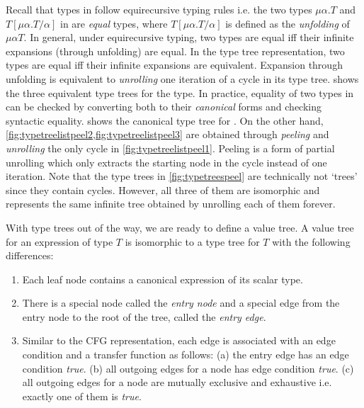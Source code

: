 Recall that types in \SpecL{} follow equirecursive typing rules i.e. the two types $\mu \alpha. T$ and $T[\mu \alpha. T/\alpha]$ in \typegrammar{}
are {\em equal} types, where $T[\mu \alpha. T/\alpha]$ is defined as the {\em unfolding} of $\mu \alpha T$.
In general, under equirecursive typing, two types are equal iff their infinite expansions (through unfolding) are equal.
In the type tree representation, two types are equal iff their infinite expansions are equivalent.
Expansion through unfolding is equivalent to {\em unrolling} one iteration of a cycle in its type tree.
 shows the three equivalent type trees for the  type.
In practice, equality of two types in \typegrammar{} can be checked by converting both to their {\em canonical} forms
and checking syntactic equality.
 shows the canonical type tree for .
On the other hand, \cref{fig:typetreelistpeel2,fig:typetreelistpeel3} are obtained through {\em peeling} and {\em unrolling}
the only cycle in \cref{fig:typetreelistpeel1}.
Peeling is a form of partial unrolling which only extracts the starting node in the cycle instead of one iteration.
Note that the type trees in \cref{fig:typetreespeel} are technically not `trees' since they contain cycles.
However, all three of them are isomorphic and represents the same infinite tree obtained by unrolling each of them forever.



With type trees out of the way, we are ready to define a value tree.
A value tree for an expression of type $T$ is isomorphic to a type tree for $T$
with the following differences:

\begin{enumerate}
\item Each leaf node contains a canonical expression of its scalar type.
\item There is a special node called the {\em entry node} and a special edge from the entry node
to the root of the tree, called the {\em entry edge}.
\item Similar to the CFG representation, each edge is associated with an edge condition and a
transfer function as follows:
(a) the entry edge has an edge condition {\em true}.
(b) all outgoing edges for a \circled{$\times$} node has edge condition {\em true}.
(c) all outgoing edges for a \circled{$+$} node are mutually exclusive and exhaustive
i.e. exactly one of them is {\em true}.
\end{enumerate}

